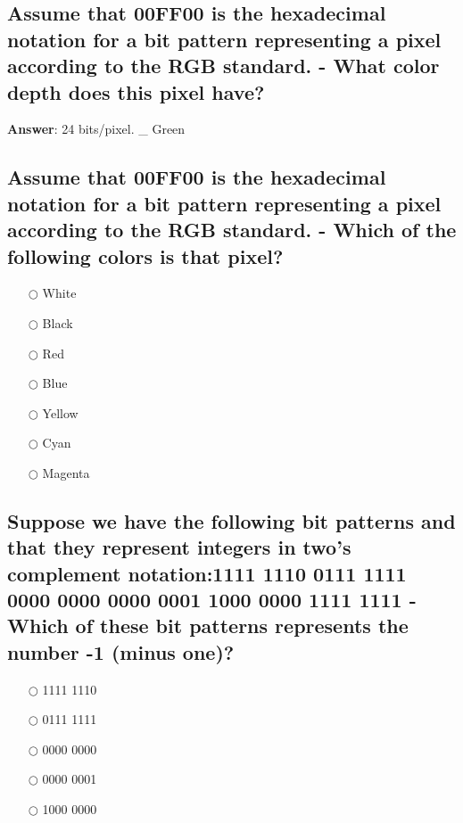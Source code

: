 \documentclass[a4paper,11pt,oneside]{article}
\begin{document}
\begin{sloppypar}
\subsection{Assume that 00FF00 is the hexadecimal notation for a bit pattern representing a pixel according to the RGB standard. - What color depth does this pixel have?}

\label{q:34900:sa:en:True}

\textbf{Answer}: 24 bits/pixel. _ Green

\subsection{Assume that 00FF00 is the hexadecimal notation for a bit pattern representing a pixel according to the RGB standard. - Which of the following colors is that pixel?}

\label{q:3490001:mc:en:True}

\begin{itemize}
  \item[$\bigcirc$] White
  \item[$\bigcirc$] Black
  \item[$\bigcirc$] Red
  \item[$\bigcirc$] Blue
  \item[$\bigcirc$] Yellow
  \item[$\bigcirc$] Cyan
  \item[$\bigcirc$] Magenta
\end{itemize}



\subsection{Suppose we have the following bit patterns and that they represent integers in two's complement notation:1111 1110 0111 1111 0000 0000 0000 0001 1000 0000 1111 1111 - Which of these bit patterns represents the number -1 (minus one)?}

\label{q:35000:mc:en:True}

\begin{itemize}
  \item[$\bigcirc$] 1111 1110
  \item[$\bigcirc$] 0111 1111
  \item[$\bigcirc$] 0000 0000
  \item[$\bigcirc$] 0000 0001
  \item[$\bigcirc$] 1000 0000
\end{itemize}


\end{sloppypar}
\end{document}
